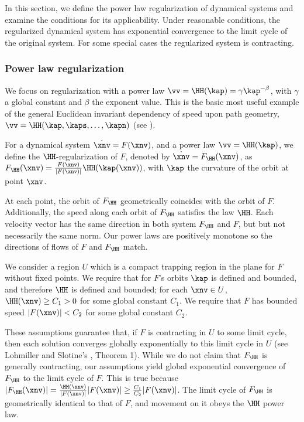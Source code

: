In this section, we define the power law regularization of dynamical systems and examine the conditions for its applicability. Under reasonable conditions, the regularized dynamical system has exponential convergence to the limit cycle of the original system. For some special cases the regularized system is contracting.

\subsubsection{Power law regularization}
We focus on regularization with a power law $\vv = \HH(\kap) = \gamma \kap^{-\beta}$, with $\gamma$ a global constant and $\beta$ the exponent value. This is the basic most useful example of the general Euclidean invariant dependency of speed upon path geometry, $\vv = \HH(\kap,\kaps,\dots,\kapn)$ (see \cite{bennequin_movement_2009}).

\begin{mydef} 
	For a dynamical system $\dot{\xnv} = F(\xnv)$, and a power law $\vv = \HH(\kap)$, we define the $\HH$-regularization of $F$, denoted by $\dot{\xnv} = F_\HH(\xnv)$, as $F_\HH(\xnv) = \frac{F(\xnv)}{|F(\xnv)|} \HH(\kap(\xnv))$, with $\kap$ the curvature of the orbit at point $\xnv$.
\end{mydef}
At each point, the orbit of $F_\HH$ geometrically coincides with the orbit of $F$. Additionally, the speed along each orbit of $F_\HH$ satisfies the law $\HH$.
Each velocity vector has the same direction in both system $F_\HH$ and $F$, but but not necessarily the same norm.
Our power laws are positively monotone so the directions of flows of $F$ and $F_\HH$ match. 

\begin{myass} We consider a region $U$ which is a compact trapping region in the plane for $F$ without fixed points. We require that for $F$'s orbits $\kap$ is defined and bounded, and therefore $\HH$ is defined and bounded; for each $\xnv \in U$, $\HH(\xnv)\geq C_1>0$ for some global constant $C_1$. We require that $F$ has bounded speed $|F(\xnv)|<C_2$ for some global constant $C_2$.
\end{myass}

These assumptions guarantee that, if $F$ is contracting in $U$ to some limit cycle, then each solution converges globally exponentially to this limit cycle in $U$ (see Lohmiller and Slotine's \cite{lohmiller_contraction_1998}, Theorem 1). While we do not claim that $F_\HH$ is generally contracting, our assumptions yield global exponential convergence of $F_\HH$ to the limit cycle of $F$. This is true because  $|F_\HH(\xnv)| = \frac{\HH(\xnv)}{|F(\xnv)|} |F(\xnv)| \geq \frac{C_1}{C_2}  |F(\xnv)|$. The limit cycle of $F_\HH$ is geometrically identical to that of $F$, and movement on it obeys the $\HH$ power law.






